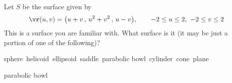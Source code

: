 

\begin{question}[M317 2010D]   %
Let $S$ be the surface given by
\begin{equation*}
\vr(u, v) = \big( u + v\,,\, u^2 + v^2 \,,\, u - v\big),\qquad
-2 \le u \le 2,\ -2 \le v \le 2
\end{equation*}
This is a surface you are familiar with. What surface is it (it may be 
just a portion of one of the following)? 
\begin{center}
sphere\quad\ 
helicoid\quad\ 
ellipsoid\quad\ 
saddle\quad\ 
parabolic bowl\quad\ 
cylinder\quad\ 
cone\quad\ 
plane
\end{center}
\end{question}

%

\begin{answer} 
      parabolic bowl
\end{answer}

